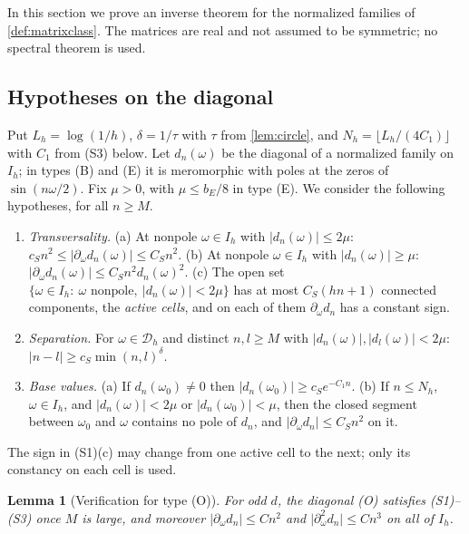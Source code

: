 \documentclass[11pt]{amsart}
\numberwithin{equation}{section}
\newtheorem{lemma}[theorem]{Lemma}
\theoremstyle{definition}
\theoremstyle{remark}
\newcommand{\abs}[1]{\lvert #1\rvert}
\newcommand{\Dh}{\mathcal D_h}
\begin{document}
In this section we prove an inverse theorem for the normalized families of \cref{def:matrixclass}. The matrices are real and not assumed to be symmetric; no spectral theorem is used.

\subsection{Hypotheses on the diagonal}
Put $L_h=\log(1/h)$, $\delta=1/\tau$ with $\tau$ from \cref{lem:circle}, and $N_h=\lfloor L_h/(4C_1)\rfloor$ with $C_1$ from (S3) below. Let $d_n(\omega)$ be the diagonal of a normalized family on $I_h$; in types (B) and (E) it is meromorphic with poles at the zeros of $\sin(n\omega/2)$. Fix $\mu>0$, with $\mu\le b_E/8$ in type (E). We consider the following hypotheses, for all $n\ge M$.

\begin{enumerate}[label=\textup{(S\arabic*)}]
\item\emph{Transversality.} (a) At nonpole $\omega\in I_h$ with $\abs{d_n(\omega)}\le2\mu$: $c_Sn^2\le\abs{\partial_\omega d_n(\omega)}\le C_Sn^2$. (b) At nonpole $\omega\in I_h$ with $\abs{d_n(\omega)}\ge\mu$: $\abs{\partial_\omega d_n(\omega)}\le C_Sn^2d_n(\omega)^2$. (c) The open set $\{\omega\in I_h:\ \omega\text{ nonpole},\ \abs{d_n(\omega)}<2\mu\}$ has at most $C_S(hn+1)$ connected components, the \emph{active cells}, and on each of them $\partial_\omega d_n$ has a constant sign.
\item\emph{Separation.} For $\omega\in\Dh$ and distinct $n,l\ge M$ with $\abs{d_n(\omega)},\abs{d_l(\omega)}<2\mu$: $\abs{n-l}\ge c_S\min(n,l)^\delta$.
\item\emph{Base values.} (a) If $d_n(\omega_0)\ne0$ then $\abs{d_n(\omega_0)}\ge c_Se^{-C_1n}$. (b) If $n\le N_h$, $\omega\in I_h$, and $\abs{d_n(\omega)}<2\mu$ or $\abs{d_n(\omega_0)}<\mu$, then the closed segment between $\omega_0$ and $\omega$ contains no pole of $d_n$, and $\abs{\partial_\omega d_n}\le C_Sn^2$ on it.
\end{enumerate}

The sign in (S1)(c) may change from one active cell to the next; only its constancy on each cell is used.

\begin{lemma}[Verification for type (O)]\label{lem:verifyO}
For odd $d$, the diagonal \textup{(O)} satisfies \textup{(S1)--(S3)} once $M$ is large, and moreover $\abs{\partial_\omega d_n}\le Cn^2$ and $\abs{\partial_\omega^2d_n}\le Cn^3$ on all of $I_h$.
\end{lemma}
\end{document}
